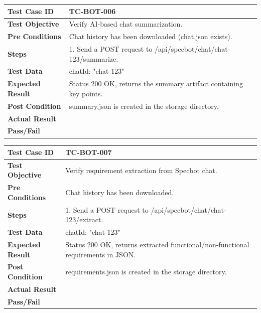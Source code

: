 \begin{longtable}{|p{}|p{}|}
\hline
\textbf{Test Case ID} & TC-BOT-006 \\ \hline
\textbf{Test Objective} & Verify AI-based chat summarization. \\ \hline
\textbf{Pre Conditions} & Chat history has been downloaded (chat.json exists). \\ \hline
\textbf{Steps} & 
1. Send a POST request to /api/specbot/chat/chat-123/summarize. \\ \hline
\textbf{Test Data} & chatId: "chat-123" \\ \hline
\textbf{Expected Result} & Status 200 OK, returns the summary artifact containing key points. \\ \hline
\textbf{Post Condition} & summary.json is created in the storage directory. \\ \hline
\textbf{Actual Result} &  \\ \hline
\textbf{Pass/Fail} &  \\ \hline
\end{longtable}

\begin{longtable}{|p{}|p{}|}
\hline
\textbf{Test Case ID} & TC-BOT-007 \\ \hline
\textbf{Test Objective} & Verify requirement extraction from Specbot chat. \\ \hline
\textbf{Pre Conditions} & Chat history has been downloaded. \\ \hline
\textbf{Steps} & 
1. Send a POST request to /api/specbot/chat/chat-123/extract. \\ \hline
\textbf{Test Data} & chatId: "chat-123" \\ \hline
\textbf{Expected Result} & Status 200 OK, returns extracted functional/non-functional requirements in JSON. \\ \hline
\textbf{Post Condition} & requirements.json is created in the storage directory. \\ \hline
\textbf{Actual Result} &  \\ \hline
\textbf{Pass/Fail} &  \\ \hline
\end{longtable}

